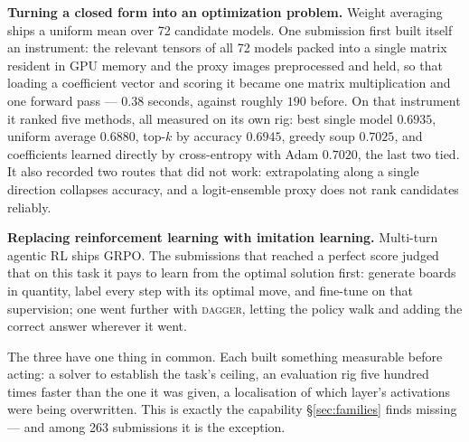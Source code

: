 \textbf{Turning a closed form into an optimization problem.} Weight averaging ships a uniform mean
over 72 candidate models. One submission first built itself an instrument: the relevant tensors of
all 72 models packed into a single matrix resident in GPU memory and the proxy images preprocessed
and held, so that loading a coefficient vector and scoring it became one matrix multiplication and
one forward pass --- $0.38$ seconds, against roughly $190$ before. On that instrument it ranked five
methods, all measured on its own rig: best single model $0.6935$, uniform average $0.6880$, top-$k$
by accuracy $0.6945$, greedy soup $0.7025$, and coefficients learned directly by cross-entropy with
Adam $0.7020$, the last two tied. It also recorded two routes that did not work: extrapolating along
a single direction collapses accuracy, and a logit-ensemble proxy does not rank candidates reliably.

\textbf{Replacing reinforcement learning with imitation learning.} Multi-turn agentic RL ships GRPO. The
submissions that reached a perfect score judged that on this task it pays to learn from the optimal
solution first: generate boards in quantity, label every step with its optimal move, and fine-tune on
that supervision; one went further with \textsc{dagger}, letting the policy walk and adding the
correct answer wherever it went.

The three have one thing in common. Each built something measurable before acting: a solver to
establish the task's ceiling, an evaluation rig five hundred times faster than the one it was given,
a localisation of which layer's activations were being overwritten. This is exactly the capability
\S\ref{sec:families} finds missing --- and among 263 submissions it is the exception.
